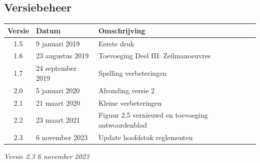 \subsection*{Versiebeheer}
\begin{table}[H]
	\centering
	\begin{tabular}{c|l|p{8cm}}
		\textbf{Versie} & \textbf{Datum} & \textbf{Omschrijving} \\ \hline
		1.5 & 9 januari 2019 & Eerste druk  \\ \hline
	    1.6 & 23 augustus 2019 & Toevoeging Deel III: Zeilmanoeuvres  \\ \hline
		1.7 & 24 september 2019  & Spelling verbeteringen \\ \hline
		2.0 & 5 januari 2020  & Afronding versie 2 \\ \hline
		2.1 & 21 maart 2020  & Kleine verbeteringen \\ \hline
		2.2 & 23 maart 2021  & Figuur 2.5 vernieuwd en toevoeging antwoordenblad \\ \hline	
		2.3 & 6 november 2023  & Update hoofdstuk reglementen
	\end{tabular}
\end{table}


\textit{Versie 2.3 \hspace{1 cm} 6 november 2023}
